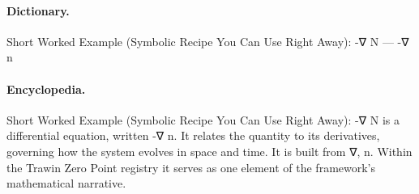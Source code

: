 \paragraph{Dictionary.}
Short Worked Example (Symbolic Recipe You Can Use Right Away): -∇ N — -∇ n

\paragraph{Encyclopedia.}
Short Worked Example (Symbolic Recipe You Can Use Right Away): -∇ N is a differential equation, written -∇ n. It relates the quantity to its derivatives, governing how the system evolves in space and time. It is built from ∇, n. Within the Trawin Zero Point registry it serves as one element of the framework's mathematical narrative.
